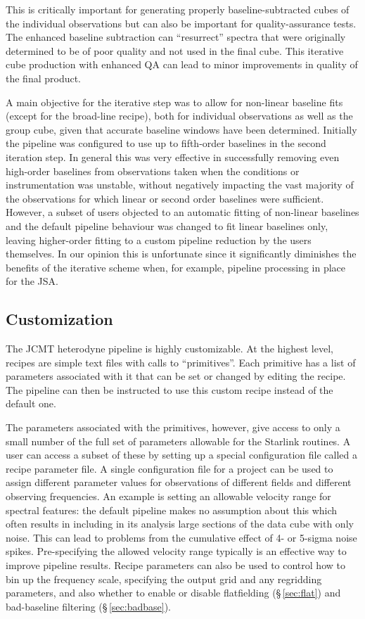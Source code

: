 \documentclass[a4paper,fleqn,usenatbib]{mnras}
\begin{document}
This is critically important for generating properly baseline-subtracted
cubes of the individual observations but can also
be important for quality-assurance tests. The enhanced baseline
subtraction can ``resurrect'' spectra that were originally determined
to be of poor quality and not used in the final cube. This iterative
cube production with enhanced QA can lead to minor improvements in
quality of the final product.

A main objective for the iterative step was to allow for non-linear baseline fits
(except for the broad-line recipe), both for individual observations as well as
the group cube, given that accurate baseline windows have been determined.
Initially the pipeline was configured to use up to fifth-order baselines in
the second iteration step. In general this was very effective in successfully
removing even high-order baselines from observations taken when the
conditions or instrumentation was unstable, without negatively impacting
the vast majority of the observations for which linear or second order baselines
were sufficient.  However, a subset of users objected to an automatic fitting of
non-linear baselines and the default pipeline behaviour was changed to
fit linear baselines only, leaving higher-order fitting to a custom pipeline reduction
by the users themselves.  In our opinion this is unfortunate since it significantly
diminishes the benefits of the iterative scheme when, for example, pipeline processing
in place for the JSA.

\subsection{Customization}

The JCMT heterodyne pipeline is highly customizable. At the highest level, recipes
are simple text files with calls to ``primitives''. Each primitive has a list of
parameters associated with it that can be set or changed by editing the recipe.
The pipeline can then be instructed to use this custom recipe instead of the default one.

The parameters associated with the primitives, however, give access to only a small
number of the full set of parameters allowable for the Starlink routines. A user can access
a subset of these by setting up a special configuration file called a recipe
parameter file. A single configuration file for a project can
be used to assign different parameter values for observations of different fields and
different observing frequencies. An example is setting an allowable velocity range for
spectral features: the default pipeline makes no assumption about this which often results
in including in its analysis large sections of the data cube with only noise. This can lead
to problems from the cumulative effect of 4- or 5-sigma noise spikes. Pre-specifying the
allowed velocity range typically is an effective way to improve
pipeline results. Recipe parameters can also be used to control how to
bin up the frequency scale, specifying the output grid and any
regridding parameters, and also whether to enable or disable
flatfielding (\S\,\ref{sec:flat}) and bad-baseline filtering (\S\,\ref{sec:badbase}).
\end{document}
